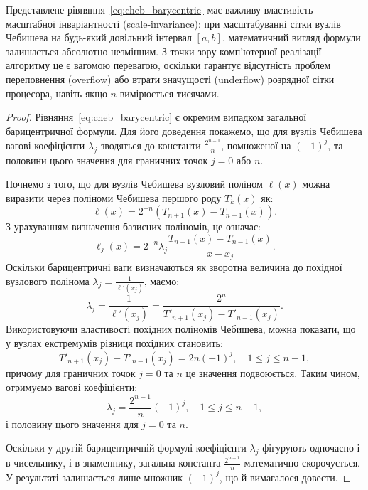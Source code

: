 Представлене рівняння~\eqref{eq:cheb_barycentric} має важливу властивість масштабної інваріантності (scale-invariance): при масштабуванні сітки вузлів Чебишева на будь-який довільний інтервал $[a, b]$, математичний вигляд формули залишається абсолютно незмінним. З точки зору комп'ютерної реалізації алгоритму це є вагомою перевагою, оскільки гарантує відсутність проблем переповнення (overflow) або втрати значущості (underflow) розрядної сітки процесора, навіть якщо $n$ вимірюється тисячами.

\begin{proof}
	Рівняння~\eqref{eq:cheb_barycentric} є окремим випадком загальної барицентричної формули. Для його доведення покажемо, що для вузлів Чебишева вагові коефіцієнти $\lambda_j$ зводяться до константи $\frac{2^{n-1}}{n}$, помноженої на $(-1)^j$, та половини цього значення для граничних точок $j=0$ або $n$.
	
	Почнемо з того, що для вузлів Чебишева вузловий поліном $\ell(x)$ можна виразити через поліноми Чебишева першого роду $T_k(x)$ як:
	\begin{equation}
		\ell(x) = 2^{-n} (T_{n+1}(x) - T_{n-1}(x)).
	\end{equation}
	З урахуванням визначення базисних поліномів, це означає:
	\begin{equation}
		\ell_j(x) = 2^{-n} \lambda_j \frac{T_{n+1}(x) - T_{n-1}(x)}{x - x_j}.
	\end{equation}
	Оскільки барицентричні ваги визначаються як зворотна величина до похідної вузлового полінома $\lambda_j = \frac{1}{\ell'(x_j)}$, маємо:
	\begin{equation}
		\lambda_j = \frac{1}{\ell'(x_j)} = \frac{2^n}{T'_{n+1}(x_j) - T'_{n-1}(x_j)}.
	\end{equation}
	Використовуючи властивості похідних поліномів Чебишева, можна показати, що у вузлах екстремумів різниця похідних становить:
	\begin{equation}
		T'_{n+1}(x_j) - T'_{n-1}(x_j) = 2n(-1)^j, \quad 1 \le j \le n-1,
	\end{equation}
	причому для граничних точок $j=0$ та $n$ це значення подвоюється. Таким чином, отримуємо вагові коефіцієнти:
	\begin{equation}\label{eq:lambda_cheb_proof}
		\lambda_j = \frac{2^{n-1}}{n}(-1)^j, \quad 1 \le j \le n-1,
	\end{equation}
	і половину цього значення для $j=0$ та $n$.
	
	Оскільки у другій барицентричній формулі коефіцієнти $\lambda_j$ фігурують одночасно і в чисельнику, і в знаменнику, загальна константа $\frac{2^{n-1}}{n}$ математично скорочується. У результаті залишається лише множник $(-1)^j$, що й вимагалося довести.
\end{proof}
%
